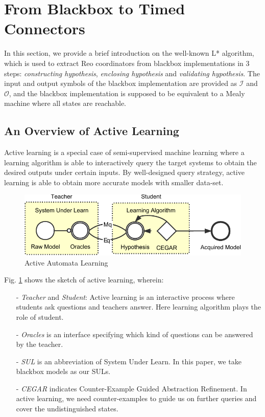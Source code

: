 \documentclass[conference, a4paper]{IEEEtran}
\begin{document}
\section{From Blackbox to Timed Connectors} 
\label{sec:activelearning}
In this section, we provide a brief introduction on the well-known L* algorithm, which is used
to extract Reo coordinators from blackbox implementations in 3 steps:
\emph{constructing hypothesis}, \emph{enclosing hypothesis} and \emph{validating hypothesis}. 
The input and output symbols of the blackbox implementation are provided as $\mathcal{I}$ and
$\mathcal{O}$, and the blackbox implementation is supposed to be equivalent to a Mealy machine where
all states are reachable.

\subsection{An Overview of Active Learning}
Active learning \cite{settles2010active} is a special case of semi-supervised machine learning where
a learning algorithm is able to interactively query the target systems to obtain the desired outputs
under certain inputs. By well-designed query strategy, active learning is able to obtain more
accurate models with smaller data-set.

\begin{figure}[ht]
  \begin{center}
    \includegraphics[width=.45\textwidth]{./images/actl.pdf}
  \end{center}
  \caption{Active Automata Learning}
  \label{fig:activelearning}
\end{figure}

Fig. \ref{fig:activelearning} shows the sketch of active learning, wherein:
\begin{itemize}
  \item[-] \emph{Teacher} and \emph{Student}: Active learning is an interactive process where
    students ask questions and teachers answer. Here learning algorithm plays the role of student.
  \item[-] \emph{Oracles} is an interface specifying which kind of questions can be answered by the
    teacher.
  \item[-] \emph{SUL} is an abbreviation of System Under Learn. In this paper, we take blackbox
    models as our SULs.
  \item[-] \emph{CEGAR} indicates Counter-Example Guided Abstraction
    Refinement\cite{DBLP:conf/cav/ClarkeGJLV00}. In active learning, we need counter-examples to
    guide us on further queries and cover the undistinguished states.
\end{itemize}
\end{document}
